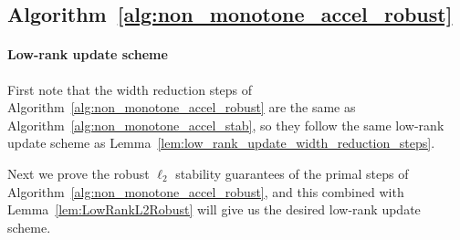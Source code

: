 \documentclass[11pt]{article}
\begin{document}
\subsection{Algorithm~\ref{alg:non_monotone_accel_robust}}\label{sec:stability_algo_2}

\paragraph{Low-rank update scheme}
First note that the width reduction steps of Algorithm~\ref{alg:non_monotone_accel_robust} are the same as Algorithm~\ref{alg:non_monotone_accel_stab}, so they follow the same low-rank update scheme as Lemma~\ref{lem:low_rank_update_width_reduction_steps}.

Next we prove the robust $\ell_2$ stability guarantees of the primal steps of Algorithm~\ref{alg:non_monotone_accel_robust}, and this combined with Lemma~\ref{lem:LowRankL2Robust} will give us the desired low-rank update scheme. 
\end{document}
